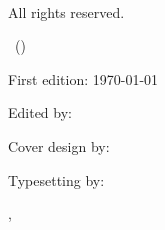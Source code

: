
\thispagestyle{empty}

\vspace*{\fill}
\small
\textbf{\mytitle}\par
\medskip
\textcopyright~\the\year\ \mypublishingcompany \par
All rights reserved. \par
\medskip

\ifxetex
  \edicionordinal\ (\the\year)\par
\else
  First edition: \today\par
\fi

\medskip
Edited by: \textit{\editorName}\par
Cover design by: \textit{\designerName}\par
\ifx
	\typesetterName\empty
\else
	Typesetting by: \textit{\typesetterName}\par
\fi

\medskip
\mypublishingcompany, \mypublishingcompanylocation \par
\vspace*{\fill}

\clearpage
